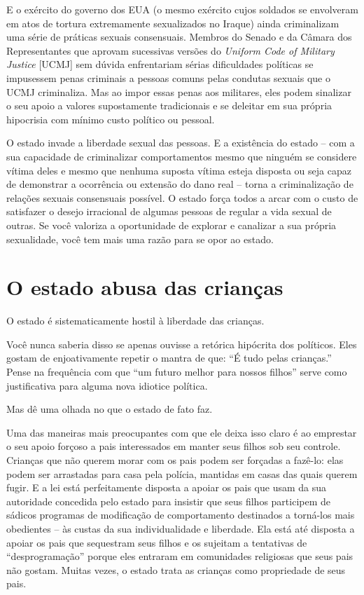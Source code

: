 E o exército do governo dos EUA (o mesmo exército cujos soldados se envolveram em atos de tortura extremamente sexualizados no Iraque) ainda criminalizam uma série de práticas sexuais consensuais. Membros do Senado e da Câmara dos Representantes que aprovam sucessivas versões do \emph{Uniform Code of Military Justice} [UCMJ] sem dúvida enfrentariam sérias dificuldades políticas se impusessem penas criminais a pessoas comuns pelas condutas sexuais que o UCMJ criminaliza. Mas ao impor essas penas aos militares, eles podem sinalizar o seu apoio a valores supostamente tradicionais e se deleitar em sua própria hipocrisia com mínimo custo político ou pessoal.

O estado invade a liberdade sexual das pessoas. E a existência do estado -- com a sua capacidade de criminalizar comportamentos mesmo que ninguém se considere vítima deles e mesmo que nenhuma suposta vítima esteja disposta ou seja capaz de demonstrar a ocorrência ou extensão do dano real -- torna a criminalização de relações sexuais consensuais possível. O estado força todos a arcar com o custo de satisfazer o desejo irracional de algumas pessoas de regular a vida sexual de outras. Se você valoriza a oportunidade de explorar e canalizar a sua própria sexualidade, você tem mais uma razão para se opor ao estado.

\section{O estado abusa das crianças}

O estado é sistematicamente hostil à liberdade das crianças.

Você nunca saberia disso se apenas ouvisse a retórica hipócrita dos políticos. Eles gostam de enjoativamente repetir o mantra de que: ``É tudo pelas crianças.'' Pense na frequência com que ``um futuro melhor para nossos filhos'' serve como justificativa para alguma nova idiotice política.

Mas dê uma olhada no que o estado de fato faz.

Uma das maneiras mais preocupantes com que ele deixa isso claro é ao emprestar o seu apoio forçoso a pais interessados em manter seus filhos sob seu controle. Crianças que não querem morar com os pais podem ser forçadas a fazê-lo: elas podem ser arrastadas para casa pela polícia, mantidas em casas das quais querem fugir. E a lei está perfeitamente disposta a apoiar os pais que usam da sua autoridade concedida pelo estado para insistir que seus filhos participem de sádicos programas de modificação de comportamento destinados a torná-los mais obedientes -- às custas da sua individualidade e liberdade. Ela está até disposta a apoiar os pais que sequestram seus filhos e os sujeitam a tentativas de ``desprogramação'' porque eles entraram em comunidades religiosas que seus pais não gostam. Muitas vezes, o estado trata as crianças como propriedade de seus pais.

